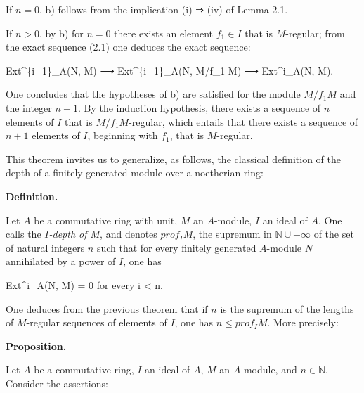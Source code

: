 \documentclass[
  11pt,
  a4paper,
]{book}
\newenvironment{Shaded}{}{}
\newcommand{\NormalTok}[1]{#1}
\begin{document}
If \(n = 0\), b) follows from the implication (i) ⇒ (iv) of Lemma 2.1.

If \(n > 0\), by b) for \(n = 0\) there exists an element
\(f_{1} \in I\) that is \(M\)-regular; from the exact sequence (2.1) one
deduces the exact sequence:

\begin{Shaded}
\begin{Highlighting}[]
\NormalTok{Ext\^{}\{i−1\}\_A(N, M) ⟶ Ext\^{}\{i−1\}\_A(N, M/f\_1 M) ⟶ Ext\^{}i\_A(N, M).}
\end{Highlighting}
\end{Shaded}

One concludes that the hypotheses of b) are satisfied for the module
\(M/f_{1} M\) and the integer \(n - 1\). By the induction hypothesis,
there exists a sequence of \(n\) elements of \(I\) that is
\(M/f_{1} M\)-regular, which entails that there exists a sequence of
\(n + 1\) elements of \(I\), beginning with \(f_{1}\), that is
\(M\)-regular.

This theorem invites us to generalize, as follows, the classical
definition of the depth of a finitely generated module over a noetherian
ring:

\textbf{Definition.}

Let \(A\) be a commutative ring with unit, \(M\) an \(A\)-module, \(I\)
an ideal of \(A\). One calls the \emph{\(I\)-depth of \(M\)}, and
denotes \(prof_{I} M\), the supremum in \(\mathbb{N} \cup {+\infty}\) of
the set of natural integers \(n\) such that for every finitely generated
\(A\)-module \(N\) annihilated by a power of \(I\), one has

\begin{Shaded}
\begin{Highlighting}[]
\NormalTok{Ext\^{}i\_A(N, M) = 0 for every i \textless{} n.}
\end{Highlighting}
\end{Shaded}

One deduces from the previous theorem that if \(n\) is the supremum of
the lengths of \(M\)-regular sequences of elements of \(I\), one has
\(n \leqslant prof_{I} M\). More precisely:

\textbf{Proposition.}

Let \(A\) be a commutative ring, \(I\) an ideal of \(A\), \(M\) an
\(A\)-module, and \(n \in \mathbb{N}\). Consider the assertions:
\end{document}
